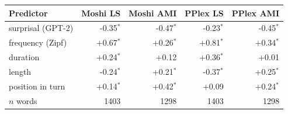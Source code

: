 \begin{tabular}{lrrrr}
\toprule
Predictor & Moshi LS & Moshi AMI & PPlex LS & PPlex AMI \\
\midrule
surprisal (GPT-2) & -0.35$^{*}$ & -0.47$^{*}$ & -0.23$^{*}$ & -0.45$^{*}$ \\
frequency (Zipf) & +0.67$^{*}$ & +0.26$^{*}$ & +0.81$^{*}$ & +0.34$^{*}$ \\
duration & +0.24$^{*}$ & +0.12 & +0.36$^{*}$ & +0.01 \\
length & -0.24$^{*}$ & +0.21$^{*}$ & -0.37$^{*}$ & +0.25$^{*}$ \\
position in turn & +0.14$^{*}$ & +0.42$^{*}$ & +0.09 & +0.24$^{*}$ \\
\midrule
$n$ words & 1403 & 1298 & 1403 & 1298 \\
\bottomrule
\end{tabular}